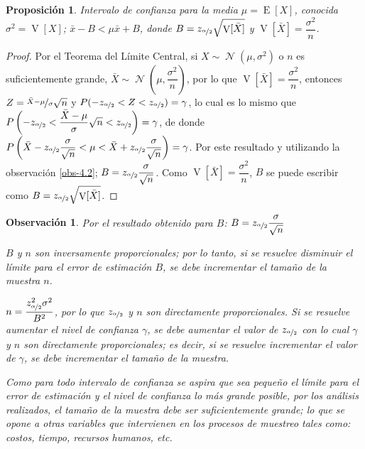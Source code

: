 \documentclass[a5paper,doc,10pt,noapacite]{apa6}
\DeclareMathOperator{\Esp}{E}
\DeclareMathOperator{\Var}{V}
\DeclareMathOperator{\Normal}{\mathcal{N}}
\newtheorem{proposicion}{Proposición}
\newtheorem{observ}{Observación}
\begin{document}
{{\begin{proposicion}
	Intervalo de confianza para la media \(\mu=\Esp[X]\), conocida \(\sigma^2=\Var[X]\); \(\bar{x}-B<\mu\bar{x}+B\), donde \(B=z_{\nicefrac{\alpha}{2}}\sqrt{\Var[\bar{X}]}\) y \(\Var[\bar{X}]=\dfrac{\sigma^2}{n}\).
\end{proposicion}
\begin{proof}
	Por el Teorema del Límite Central, si \(X\sim\Normal(\mu,\sigma^2)\) o \(n\) es suficientemente grande, \(\bar{X}\sim\Normal\left(\mu,\dfrac{\sigma^2}{n}\right)\), por lo que \(\Var[\bar{X}]=\dfrac{\sigma^2}{n}\), entonces \(Z=\nicefrac{\bar{X}-\mu}{\sigma}\sqrt{n}\) y \(P(-z_{\nicefrac{\alpha}{2}}<Z<z_{\nicefrac{\alpha}{2}})=\gamma\), lo cual es lo mismo que \(P\left(-z_{\nicefrac{\alpha}{2}}<\dfrac{\bar{X}-\mu}{\sigma}\sqrt{n}<z_{\nicefrac{\alpha}{2}}\right)=\gamma\), de donde \(P\left(\bar{X}-z_{\nicefrac{\alpha}{2}}\dfrac{\sigma}{\sqrt{n}}<\mu<\bar{X}+z_{\nicefrac{\alpha}{2}}\dfrac{\sigma}{\sqrt{n}}\right)=\gamma\). Por este resultado y utilizando la observación \eqref{obs-4.2}; \(B=z_{\nicefrac{\alpha}{2}}\dfrac{\sigma}{\sqrt{n}}\).  Como \(\Var[\bar{X}]=\dfrac{\sigma^2}{n}\), \(B\) se puede escribir como \(B=z_{\nicefrac{\alpha}{2}}\sqrt{\Var[\bar{X}]}\).
\end{proof}

\begin{observ}\label{obs-4.4}
	Por el resultado obtenido para \(B\): \(B=z_{\nicefrac{\alpha}{2}}\dfrac{\sigma}{\sqrt{n}}\)
	\begin{APAenumerate}
		\item \(B\) y \(n\) son inversamente proporcionales; por lo tanto, si se resuelve disminuir el límite para el error de estimación \(B\),  se debe incrementar el tamaño de la muestra \(n\).
		\item \(n=\dfrac{z_{\nicefrac{\alpha}{2}}^2\sigma^2}{B^2}\), por lo que \(z_{\nicefrac{\alpha}{2}}\) y \(n\) son directamente proporcionales. Si se resuelve aumentar el nivel de confianza \(\gamma\), se debe aumentar	 el valor de \(z_{\nicefrac{\alpha}{2}}\) con lo cual \(\gamma\) y \(n\) son directamente proporcionales; es decir, si se resuelve incrementar el valor de \(\gamma\), se debe incrementar el tamaño de la muestra.
	\end{APAenumerate}

Como para todo intervalo de confianza se aspira que sea pequeño el límite para el error de estimación y el nivel de confianza lo más grande posible, por los análisis realizados, el tamaño de la muestra debe ser suficientemente grande; lo que se opone a otras variables que intervienen en los procesos de muestreo tales como: costos, tiempo, recursos humanos, etc.


\end{observ}}}
\end{document}

